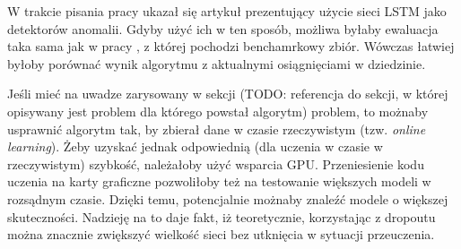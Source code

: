 W trakcie pisania pracy ukazał się artykuł \cite{LSTM_ANOMALY_DET} prezentujący użycie sieci LSTM jako detektorów anomalii. Gdyby użyć ich w ten sposób, możliwa byłaby ewaluacja taka sama jak w pracy \cite{BENCHMARK_SET}, z której pochodzi benchamrkowy zbiór. Wówczas łatwiej byłoby porównać wynik algorytmu z aktualnymi osiągnięciami w dziedzinie.

Jeśli mieć na uwadze zarysowany w sekcji (TODO: referencja do sekcji, w której opisywany jest problem dla którego powstał algorytm) problem, to możnaby usprawnić algorytm tak, by zbierał dane w czasie rzeczywistym (tzw. \textit{online learning}). Żeby uzyskać jednak odpowiednią (dla uczenia w czasie w rzeczywistym) szybkość, należałoby użyć wsparcia GPU. Przeniesienie kodu uczenia na karty graficzne pozwoliłoby też na testowanie większych modeli w rozsądnym czasie. Dzięki temu, potencjalnie możnaby znaleźć modele o większej skuteczności. Nadzieję na to daje fakt, iż teoretycznie, korzystając z dropoutu \cite{DROPOUT_RNN} można znacznie zwiększyć wielkość sieci bez utknięcia w sytuacji przeuczenia.
